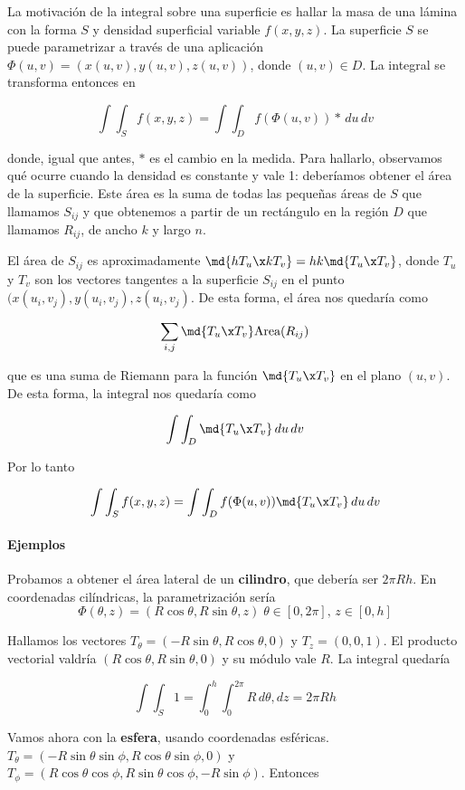 \documentclass[nochap]{apuntes}
\begin{document}
La motivación de la integral sobre una superficie es hallar la masa de una lámina con la forma $S$ y densidad superficial variable $f(x,y,z)$. La superficie $S$ se puede parametrizar a través de una aplicación $\Phi(u,v) = (x(u,v), y(u,v), z(u,v))$, donde $(u,v) \in D$. La integral se transforma entonces en

\[ \int\int_Sf(x,y,z) = \int\int_D f(\Phi(u,v))\ast \,du\,dv \]

donde, igual que antes, $\ast$ es el cambio en la medida. Para hallarlo, observamos qué ocurre cuando la densidad es constante y vale 1: deberíamos obtener el área de la superficie. Este área es la suma de todas las pequeñas áreas de $S$ que llamamos $S_{ij}$ y que obtenemos a partir de un rectángulo en la región $D$ que llamamos $R_{ij}$, de ancho $k$ y largo $n$.

El área de $S_{ij}$ es aproximadamente $\md{hT_u\x k T_v} = hk\md{T_u\x T_v}$, donde $T_u$ y $T_v$ son los vectores tangentes a la superficie $S_{ij}$ en el punto $(x(u_i, v_j), y(u_i, v_j), z(u_i, v_j)$. De esta forma, el área nos quedaría como

\[ \sum_{i,j}\md{T_u\x T_v} \text{Area}(R_{ij}) \]

que es una suma de Riemann para la función $\md{T_u\x T_v}$ en el plano $(u,v)$. De esta forma, la integral nos quedaría como 

\[ \int\int_D \md{T_u\x T_v}\,du\,dv \]

Por lo tanto

\[ \int\int_Sf(x,y,z) = \int\int_D f(\Phi(u,v))\md{T_u\x T_v} \,du\,dv \]

\paragraph{Ejemplos}

Probamos a obtener el área lateral de un \textbf{cilindro}, que debería ser $2\pi Rh$. En coordenadas cilíndricas, la parametrización sería \[\Phi(\theta, z) =(R\cos\theta, R\sin\theta, z)\;\theta\in [0,2\pi],\,z\in [0, h]\]

Hallamos los vectores $T_\theta =(-R\sin\theta, R\cos\theta, 0)$ y $T_z=(0,0,1)$. El producto vectorial valdría $(R\cos\theta, R\sin\theta,0)$ y su módulo vale $R$. La integral quedaría

\[ \int\int_S 1 = \int_0^h\int_0^{2\pi}R\,d\theta, dz = 2\pi Rh \]

Vamos ahora con la \textbf{esfera}, usando coordenadas esféricas. $T_\theta = (-R\sin\theta\sin\phi, R\cos\theta\sin\phi,0)$ y $T_\phi = ( R\cos\theta\cos\phi, R\sin\theta\cos\phi, -R\sin\phi)$. Entonces
\end{document}
